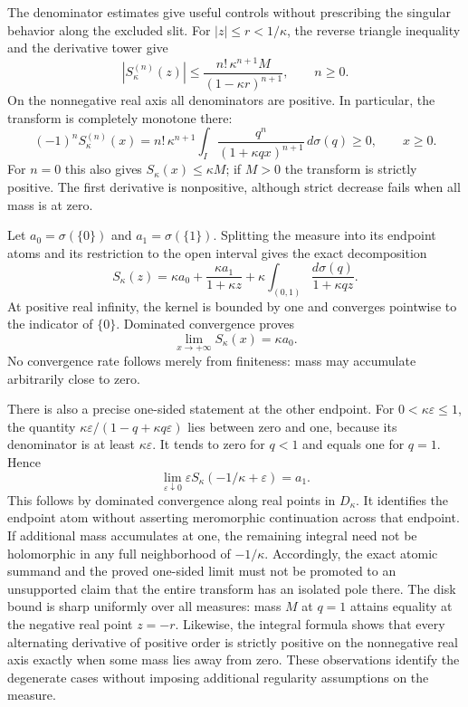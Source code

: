 \label{res:bounds}
The denominator estimates give useful controls without prescribing the
singular behavior along the excluded slit. For $|z|\le r<1/\kappa$,
the reverse triangle inequality and the derivative tower give
\[
 |S_\kappa^{(n)}(z)|
 \le\frac{n!\,\kappa^{n+1}M}{(1-\kappa r)^{n+1}},\qquad n\ge0.
\]
On the nonnegative real axis all denominators are positive. In
particular, the transform is completely monotone there:
\[
 (-1)^nS_\kappa^{(n)}(x)
 =n!\,\kappa^{n+1}\int_I\frac{q^n}{(1+\kappa qx)^{n+1}}\,d\sigma(q)
 \ge0,\qquad x\ge0.
\]
For $n=0$ this also gives $S_\kappa(x)\le\kappa M$; if $M>0$ the
transform is strictly positive. The first derivative is nonpositive,
although strict decrease fails when all mass is at zero.

Let $a_0=\sigma(\{0\})$ and $a_1=\sigma(\{1\})$. Splitting the measure
into its endpoint atoms and its restriction to the open interval gives
the exact decomposition
\[
 S_\kappa(z)=\kappa a_0+\frac{\kappa a_1}{1+\kappa z}
       +\kappa\int_{(0,1)}\frac{d\sigma(q)}{1+\kappa qz}.
\]
At positive real infinity, the kernel is bounded by one and converges
pointwise to the indicator of $\{0\}$. Dominated convergence proves
\[
 \lim_{x\to+\infty}S_\kappa(x)=\kappa a_0.
\]
No convergence rate follows merely from finiteness: mass may accumulate
arbitrarily close to zero.

There is also a precise one-sided statement at the other endpoint.
For $0<\kappa\varepsilon\le1$, the quantity
$\kappa\varepsilon/(1-q+\kappa q\varepsilon)$ lies between zero and
one, because its denominator is at least $\kappa\varepsilon$.
It tends to zero for $q<1$ and equals one for $q=1$. Hence
\[
 \lim_{\varepsilon\downarrow0}
 \varepsilon S_\kappa(-1/\kappa+\varepsilon)=a_1.
\]
This follows by dominated convergence along real points in $D_\kappa$.
It identifies the endpoint atom without asserting meromorphic
continuation across that endpoint. If additional mass accumulates at
one, the remaining integral need not be holomorphic in any full
neighborhood of $-1/\kappa$. Accordingly, the exact atomic summand and
the proved one-sided limit must not be promoted to an unsupported
claim that the entire transform has an isolated pole there.
The disk bound is sharp uniformly over all measures: mass $M$ at
$q=1$ attains equality at the negative real point $z=-r$.
Likewise, the integral formula shows that every alternating derivative
of positive order is strictly positive on the nonnegative real axis
exactly when some mass lies away from zero. These observations identify
the degenerate cases without imposing additional regularity assumptions
on the measure.

